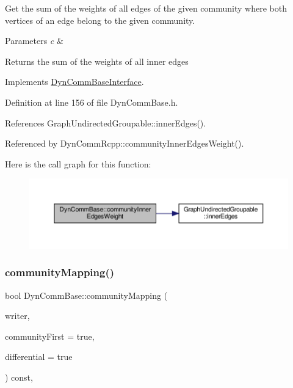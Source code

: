 Get the sum of the weights of all edges of the given community where both vertices of an edge belong to the given community.


\begin{DoxyParams}{Parameters}
{\em c} & \\
\hline
\end{DoxyParams}
\begin{DoxyReturn}{Returns}
the sum of the weights of all inner edges 
\end{DoxyReturn}


Implements \hyperlink{classDynCommBaseInterface_a0e68dcfcc55385ce60b000d76ccd2d86}{Dyn\+Comm\+Base\+Interface}.



Definition at line 156 of file Dyn\+Comm\+Base.\+h.



References Graph\+Undirected\+Groupable\+::inner\+Edges().



Referenced by Dyn\+Comm\+Rcpp\+::community\+Inner\+Edges\+Weight().

Here is the call graph for this function\+:\nopagebreak
\begin{figure}[H]
\begin{center}
\leavevmode
\includegraphics[width=350pt]{classDynCommBase_ada91e7e914eb8be7f8c25f4c0c81156a_cgraph}
\end{center}
\end{figure}
\mbox{\label{classDynCommBase_a75ed5e0546d756a3b327f41e292620b2}} 
\subsubsection{\texorpdfstring{community\+Mapping()}{communityMapping()}}
{\footnotesize\ttfamily bool Dyn\+Comm\+Base\+::community\+Mapping (\begin{DoxyParamCaption}\item[{\hyperlink{classWriterInterface}{Writer\+Interface} $\ast$}]{writer,  }\item[{bool}]{community\+First = {\ttfamily true},  }\item[{bool}]{differential = {\ttfamily true} }\end{DoxyParamCaption}) const\hspace{0.3cm}{\ttfamily [inline]}, {\ttfamily [virtual]}}

